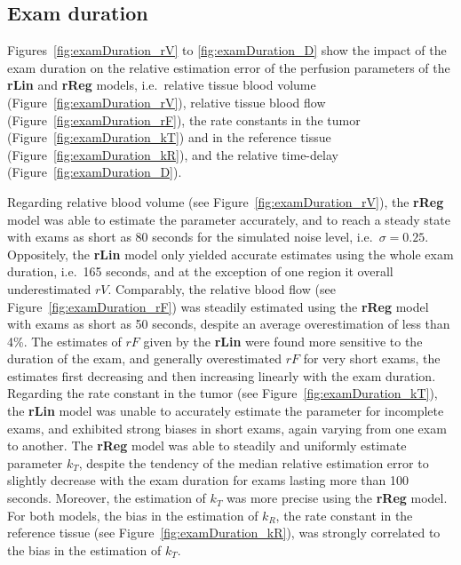 \subsection{Exam duration}
Figures~\ref{fig:examDuration_rV} to \ref{fig:examDuration_D} show the impact of the exam duration on the relative estimation error of the perfusion parameters of the \textbf{rLin} and \textbf{rReg} models, i.e.~relative tissue blood volume (Figure~\ref{fig:examDuration_rV}), relative tissue blood flow (Figure~\ref{fig:examDuration_rF}), the rate constants in the tumor (Figure~\ref{fig:examDuration_kT}) and in the reference tissue (Figure~\ref{fig:examDuration_kR}), and the relative time-delay (Figure~\ref{fig:examDuration_D}).

Regarding relative blood volume (see Figure~\ref{fig:examDuration_rV}), the \textbf{rReg} model was able to estimate the parameter accurately, and to reach a steady state with exams as short as 80 seconds for the simulated noise level, i.e.~$\sigma = 0.25$.
Oppositely, the \textbf{rLin} model only yielded accurate estimates using the whole exam duration, i.e.~165 seconds, and at the exception of one region it overall underestimated $rV$.
Comparably, the relative blood flow (see Figure~\ref{fig:examDuration_rF}) was steadily estimated using the \textbf{rReg} model with exams as short as 50 seconds, despite an average overestimation of less than 4\%.
The estimates of $rF$ given by the \textbf{rLin} were found more sensitive to the duration of the exam, and generally overestimated $rF$ for very short exams, the estimates first decreasing and then increasing linearly with the exam duration.
Regarding the rate constant in the tumor (see Figure~\ref{fig:examDuration_kT}), the \textbf{rLin} model was unable to accurately estimate the parameter for incomplete exams, and exhibited strong biases in short exams, again varying from one exam to another. 
The \textbf{rReg} model was able to steadily and uniformly estimate parameter $k_T$, despite the tendency of the median relative estimation error to slightly decrease with the exam duration for exams lasting more than 100 seconds.
Moreover, the estimation of $k_T$ was more precise using the \textbf{rReg} model.
For both models, the bias in the estimation of $k_R$, the rate constant in the reference tissue (see Figure~\ref{fig:examDuration_kR}), was strongly correlated to the bias in the estimation of $k_T$.

